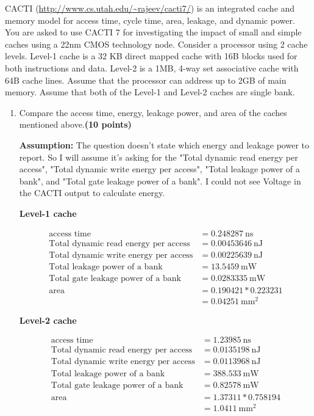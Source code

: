 \documentclass[a4paper, 11pt]{exam}
\begin{document}
\begin{enumerate}
CACTI (\url{http://www.cs.utah.edu/~rajeev/cacti7/}) is an integrated cache and memory model for access time, cycle time, area, leakage, and dynamic power. You are asked to use CACTI 7 for investigating the impact of small and simple caches using a 22nm CMOS technology node. Consider a processor using 2 cache levels. Level-1 cache is a 32 KB direct mapped cache with 16B blocks used for both instructions and data. Level-2 is a 1MB, 4-way set associative cache with 64B cache lines. Assume that the processor can address up to 2GB of main memory. Assume that both of the Level-1 and Level-2 caches are single bank.
\begin{enumerate}
	\item Compare the access time, energy, leakage power, and area of the caches mentioned above.\textbf{(10 points)} 
	
	\textbf{Assumption:} The question doesn't state which energy and leakage power to report. So I will assume it's asking for the "Total dynamic read energy per access", "Total dynamic write energy per access", "Total leakage power of a bank", and "Total gate leakage power of a bank". I could not see Voltage in the CACTI output to calculate energy.

\textbf{Level-1 cache}

\begin{align*}
\text{access time} &= 0.248287 \ \text{ns}\\
\text{Total dynamic read energy per access} &= 0.00453646 \ \text{nJ}\\
\text{Total dynamic write energy per access} &= 0.00225639 \ \text{nJ}\\
\text{Total leakage power of a bank} &= 13.5459 \ \text{mW} \\
\text{Total gate leakage power of a bank} &= 0.0283335 \ \text{mW} \\
\text{area} &= 0.190421 * 0.223231 \\ 
            &= 0.04251 \ \text{mm}^2   
\end{align*}

\textbf{Level-2 cache}

\begin{align*}
\text{access time} &= 1.23985 \ \text{ns}\\
\text{Total dynamic read energy per access} &= 0.0135198 \ \text{nJ}\\
\text{Total dynamic write energy per access} &= 0.0113968 \ \text{nJ}\\
\text{Total leakage power of a bank} &= 388.533 \ \text{mW} \\
\text{Total gate leakage power of a bank} &= 0.82578 \ \text{mW} \\
\text{area} &= 1.37311 * 0.758194 \\ 
            &= 1.0411 \ \text{mm}^2   
\end{align*}


\end{enumerate}
\end{enumerate}
\end{document}
